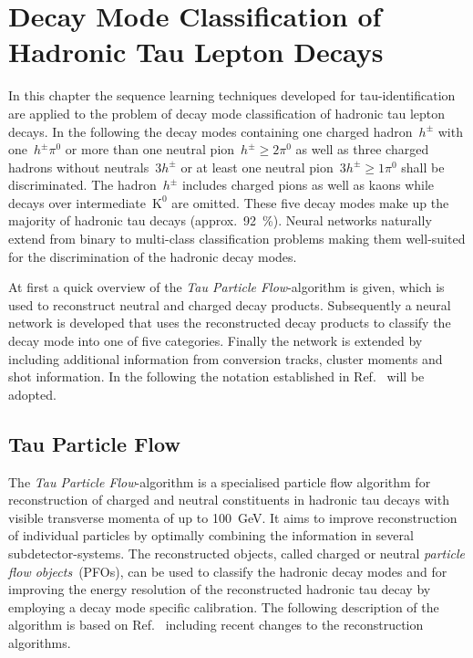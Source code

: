 \chapter{Decay Mode Classification of Hadronic Tau Lepton Decays}
\label{sec:decaymode}

In this chapter the sequence learning techniques developed for
tau-identification are applied to the problem of decay mode classification of
hadronic tau lepton decays. In the following the decay modes containing one
charged hadron~$h^\pm$ with one~$h^\pm \pi^0$ or more than one neutral
pion~$h^\pm \geq 2\pi^0$ as well as three charged hadrons without
neutrals~$3h^\pm$ or at least one neutral pion~$3h^\pm \geq 1\pi^0$ shall be
discriminated. The hadron~$h^\pm$ includes charged pions as well as kaons while
decays over intermediate~$\text{K}^0$ are omitted. These five decay modes make
up the majority of hadronic tau decays (approx.\ \SI{92}{\percent}). Neural
networks naturally extend from binary to multi-class classification problems
making them well-suited for the discrimination of the hadronic decay modes.

At first a quick overview of the \emph{Tau Particle Flow}-algorithm is given,
which is used to reconstruct neutral and charged decay products. Subsequently a
neural network is developed that uses the reconstructed decay products to
classify the decay mode into one of five categories. Finally the network is
extended by including additional information from conversion tracks, cluster
moments and shot information. In the following the notation established in
Ref.~\cite{atlas:taurec:decaymodes} will be adopted.



\section{Tau Particle Flow}
\label{sec:tau_pflow}

The \emph{Tau Particle Flow}-algorithm is a specialised particle flow algorithm
for reconstruction of charged and neutral constituents in hadronic tau decays
with visible transverse momenta of up to \SI{100}{\giga\electronvolt}. It aims
to improve reconstruction of individual particles by optimally combining the
information in several subdetector-systems. The reconstructed objects, called
charged or neutral \emph{particle flow objects}~(PFOs), can be used to classify
the hadronic decay modes and for improving the energy resolution of the
reconstructed hadronic tau decay by employing a decay mode specific calibration.
The following description of the algorithm is based on
Ref.~\cite{atlas:taurec:decaymodes} including recent changes to the
reconstruction algorithms.

